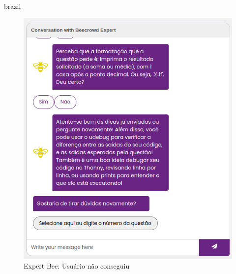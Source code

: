 \begin{otherlanguage*}{brazil}
\begin{figure}[H]
    \centering
            \caption{Expert Bee: Usuário não conseguiu}
            \label{fig:ModeloConceitual}
        \includegraphics[scale=0.63]{pictures/desenvolvimento/expert_bee_final_nao_deu_certo.png}
\end{figure}

\end{otherlanguage*}

